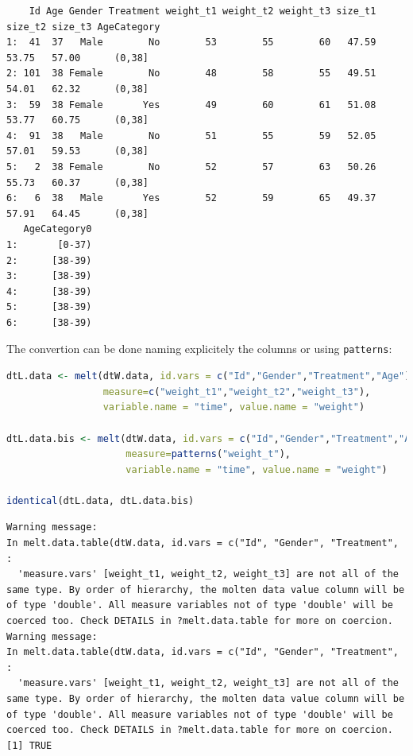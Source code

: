 \documentclass{article}
\begin{document}
\label{}
\begin{verbatim}
    Id Age Gender Treatment weight_t1 weight_t2 weight_t3 size_t1 size_t2 size_t3 AgeCategory
1:  41  37   Male        No        53        55        60   47.59   53.75   57.00      (0,38]
2: 101  38 Female        No        48        58        55   49.51   54.01   62.32      (0,38]
3:  59  38 Female       Yes        49        60        61   51.08   53.77   60.75      (0,38]
4:  91  38   Male        No        51        55        59   52.05   57.01   59.53      (0,38]
5:   2  38 Female        No        52        57        63   50.26   55.73   60.37      (0,38]
6:   6  38   Male       Yes        52        59        65   49.37   57.91   64.45      (0,38]
   AgeCategory0
1:       [0-37)
2:      [38-39)
3:      [38-39)
4:      [38-39)
5:      [38-39)
6:      [38-39)
\end{verbatim}

The convertion can be done naming explicitely the columns or using \texttt{patterns}:
\begin{lstlisting}[language=r,numbers=none]
dtL.data <- melt(dtW.data, id.vars = c("Id","Gender","Treatment","Age"), 
                 measure=c("weight_t1","weight_t2","weight_t3"), 
                 variable.name = "time", value.name = "weight")

dtL.data.bis <- melt(dtW.data, id.vars = c("Id","Gender","Treatment","Age"), 
                     measure=patterns("weight_t"), 
                     variable.name = "time", value.name = "weight")

identical(dtL.data, dtL.data.bis)
\end{lstlisting}

\label{}
\begin{verbatim}
Warning message:
In melt.data.table(dtW.data, id.vars = c("Id", "Gender", "Treatment",  :
  'measure.vars' [weight_t1, weight_t2, weight_t3] are not all of the same type. By order of hierarchy, the molten data value column will be of type 'double'. All measure variables not of type 'double' will be coerced too. Check DETAILS in ?melt.data.table for more on coercion.
Warning message:
In melt.data.table(dtW.data, id.vars = c("Id", "Gender", "Treatment",  :
  'measure.vars' [weight_t1, weight_t2, weight_t3] are not all of the same type. By order of hierarchy, the molten data value column will be of type 'double'. All measure variables not of type 'double' will be coerced too. Check DETAILS in ?melt.data.table for more on coercion.
[1] TRUE
\end{verbatim}
\end{document}
